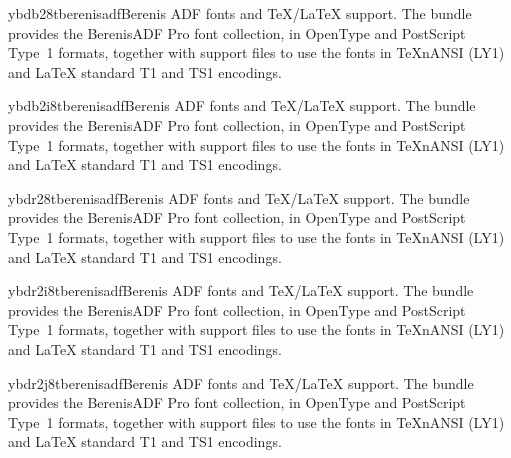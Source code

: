 \documentclass{ddltxtyp}
\begin{document}
\begin{package}{ybdb28t}{berenisadf}{Berenis ADF fonts and {\TeX}/{\LaTeX} support.}
The bundle provides the BerenisADF Pro font collection, in
OpenType and PostScript Type~1 formats, together with support
files to use the fonts in {\TeX}nANSI (LY1) and {\LaTeX} standard T1
and TS1 encodings.
\end{package}
\begin{package}{ybdb2i8t}{berenisadf}{Berenis ADF fonts and {\TeX}/{\LaTeX} support.}
The bundle provides the BerenisADF Pro font collection, in
OpenType and PostScript Type~1 formats, together with support
files to use the fonts in {\TeX}nANSI (LY1) and {\LaTeX} standard T1
and TS1 encodings.
\end{package}
\begin{package}{ybdr28t}{berenisadf}{Berenis ADF fonts and {\TeX}/{\LaTeX} support.}
The bundle provides the BerenisADF Pro font collection, in
OpenType and PostScript Type~1 formats, together with support
files to use the fonts in {\TeX}nANSI (LY1) and {\LaTeX} standard T1
and TS1 encodings.
\end{package}
\begin{package}{ybdr2i8t}{berenisadf}{Berenis ADF fonts and {\TeX}/{\LaTeX} support.}
The bundle provides the BerenisADF Pro font collection, in
OpenType and PostScript Type~1 formats, together with support
files to use the fonts in {\TeX}nANSI (LY1) and {\LaTeX} standard T1
and TS1 encodings.
\end{package}
\begin{package}{ybdr2j8t}{berenisadf}{Berenis ADF fonts and {\TeX}/{\LaTeX} support.}
The bundle provides the BerenisADF Pro font collection, in
OpenType and PostScript Type~1 formats, together with support
files to use the fonts in {\TeX}nANSI (LY1) and {\LaTeX} standard T1
and TS1 encodings.
\end{package}

\end{document}
